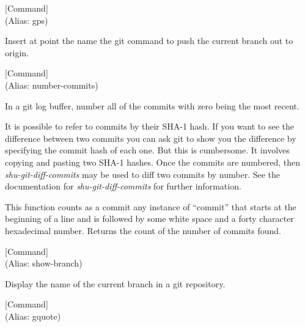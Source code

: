 \vspace{1em}
\noindent
{}
\usebox{\funcname}
 \hfill [Command]\\%
 (Alias: gps)

\begin{doc-string}
Insert at point the name the git command to push the current branch out
to origin.
\end{doc-string}

\vspace{1em}
\noindent
{}
\usebox{\funcname}
 \hfill [Command]\\%
 (Alias: number-commits)

\begin{doc-string}
In a git log buffer, number all of the commits with zero being the most
recent.

It is possible to refer to commits by their SHA-1 hash.  If you want to see the
difference between two commits you can ask git to show you the difference by
specifying the commit hash of each one.  But this is cumbersome.  It involves
copying and pasting two SHA-1 hashes.  Once the commits are numbered, then
\emph{shu-git-diff-commits} may be used to diff two commits by number.  See the
documentation for \emph{shu-git-diff-commits} for further information.

This function counts as a commit any instance of ``commit'' that starts at the
beginning of a line and is followed by some white space and a forty character
hexadecimal number.  Returns the count of the number of commits found.
\end{doc-string}

\vspace{1em}
\noindent
{}
\usebox{\funcname}
 \hfill [Command]\\%
 (Alias: show-branch)

\begin{doc-string}
Display the name of the current branch in a git repository.
\end{doc-string}

\vspace{1em}
\noindent
{}
\usebox{\funcname}
 \hfill [Command]\\%
 (Alias: gquote)

